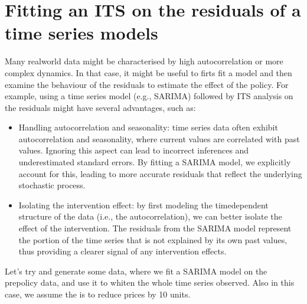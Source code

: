 \documentclass[letterpaper,10pt,english]{jupyterBook}
\begin{document}
\section{Fitting an ITS on the residuals of a time series models}
\label{\detokenize{notebooks/interrupted_time_series:fitting-an-its-on-the-residuals-of-a-time-series-models}}
\sphinxAtStartPar
Many real\sphinxhyphen{}world data might be characterised by high autocorrelation or more complex dynamics. In that case, it might be useful to firts fit a model and then examine the behaviour of the residuals to estimate the effect of the policy. For example, using a time series model (e.g., SARIMA) followed by ITS analysis on the residuals might have several advantages, such as:
\begin{itemize}
\item {} 
\sphinxAtStartPar
Handling autocorrelation and seasonality: time series data often exhibit autocorrelation and seasonality, where current values are correlated with past values. Ignoring this aspect can lead to incorrect inferences and underestimated standard errors. By fitting a SARIMA model, we explicitly account for this, leading to more accurate residuals that reflect the underlying stochastic process.

\item {} 
\sphinxAtStartPar
Isolating the intervention effect: by first modeling the time\sphinxhyphen{}dependent structure of the data (i.e., the autocorrelation), we can better isolate the effect of the intervention. The residuals from the SARIMA model represent the portion of the time series that is not explained by its own past values, thus providing a clearer signal of any intervention effects.

\end{itemize}

\sphinxAtStartPar
Let’s try and generate some data, where we fit a SARIMA model on the pre\sphinxhyphen{}policy data, and use it to whiten the whole time series observed. Also in this case, we assume the  is to reduce prices by 10 units.
\end{document}

